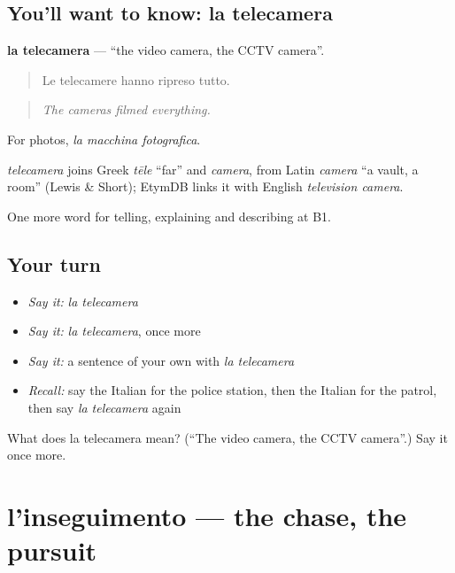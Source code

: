 \subsection*{You'll want to know: la telecamera}
\textbf{la telecamera} — \textquotedblleft{}the video camera, the CCTV camera\textquotedblright{}.

\begin{quote}
Le telecamere hanno ripreso tutto.
\end{quote}

\begin{quote}
\emph{The cameras filmed everything.}
\end{quote}

For photos, \emph{la macchina fotografica}.

\begin{cousinweb}
\emph{telecamera} joins Greek \emph{tēle} \textquotedblleft{}far\textquotedblright{} and \emph{camera}, from Latin \emph{camera} \textquotedblleft{}a vault, a room\textquotedblright{} (Lewis \& Short); EtymDB links it with English \emph{television camera}.
\end{cousinweb}

\begin{grammarlens}[title={What you've built}]
One more word for telling, explaining and describing at B1.
\end{grammarlens}

\subsection*{Your turn}
\begin{itemize}
\raggedright
  \item \emph{Say it:} \emph{la telecamera}
  \item \emph{Say it:} \emph{la telecamera}, once more
  \item \emph{Say it:} a sentence of your own with \emph{la telecamera}
  \item \emph{Recall:} say the Italian for the police station, then the Italian for the patrol, then say \emph{la telecamera} again
\end{itemize}

\begin{tcolorbox}[breakable,colback=teal!4,colframe=teal!35!black,title={Before you move on}]
What does la telecamera mean? (\textquotedblleft{}The video camera, the CCTV camera\textquotedblright{}.) Say it once more.
\end{tcolorbox}
\section[l'inseguimento]{l'inseguimento — the chase, the pursuit}

